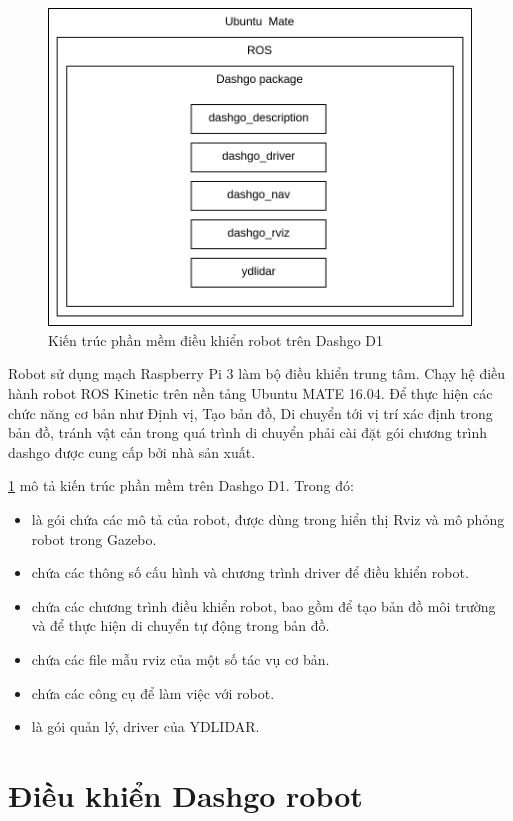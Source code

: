 \begin{figure}[htbp]
    \centering
    \includegraphics[width=0.7\linewidth]{figures/dashgo-architecture.png}
    \caption{Kiến trúc phần mềm điều khiển robot trên Dashgo D1}
    \label{fig:dashgo-architecture}
\end{figure}

Robot sử dụng mạch Raspberry Pi 3 làm bộ điều khiển trung tâm. Chạy hệ điều hành robot ROS Kinetic trên nền tảng Ubuntu MATE 16.04. Để thực hiện các chức năng cơ bản như Định vị, Tạo bản đồ, Di chuyển tới vị trí xác định trong bản đồ, tránh vật cản trong quá trình di chuyển phải cài đặt gói chương trình dashgo được cung cấp bởi nhà sản xuất.

\figurename{ \ref{fig:dashgo-architecture}} mô tả kiến trúc phần mềm trên Dashgo D1. Trong đó:
\begin{itemize}
    \item {} là gói chứa các mô tả của robot, được dùng trong hiển thị Rviz và mô phỏng robot trong Gazebo.
    \item {} chứa các thông số cấu hình và chương trình driver để điều khiển robot.
    \item {} chứa các chương trình điều khiển robot, bao gồm  để tạo bản đồ môi trường và  để thực hiện di chuyển tự động trong bản đồ.
    \item {} chứa các file mẫu rviz của một số tác vụ cơ bản.
    \item {} chứa các công cụ để làm việc với robot.
    \item {} là gói quản lý, driver của YDLIDAR.
\end{itemize}

\section{Điều khiển Dashgo robot}

